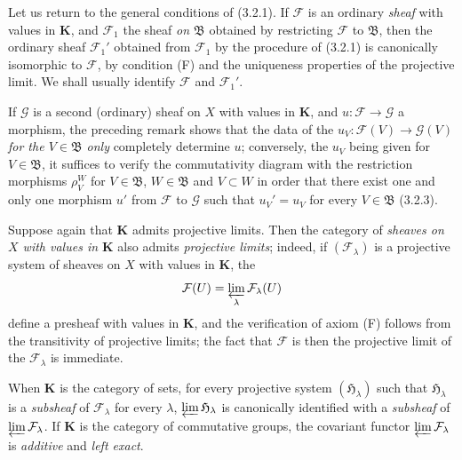 \begin{env}[3.2.5]
\label{0.3.2.5}
Let us return to the general conditions of (3.2.1). If $\mathcal{F}$ is an
ordinary \emph{sheaf} with values in $\boldsymbol{K}$, and $\mathcal{F}_1$ the
sheaf \emph{on $\mathfrak{B}$} obtained by restricting $\mathcal{F}$ to
$\mathfrak{B}$, then the ordinary sheaf $\mathcal{F}_1'$ obtained from
$\mathcal{F}_1$ by the procedure of (3.2.1) is canonically isomorphic to
$\mathcal{F}$, by condition (F) and the uniqueness properties of the
projective limit. We shall usually identify $\mathcal{F}$ and
$\mathcal{F}_1'$.

If $\mathcal{G}$ is a second (ordinary) sheaf on $X$ with values in
$\boldsymbol{K}$, and $u:\mathcal{F}\to\mathcal{G}$ a morphism, the preceding
remark shows that the data of the
$u_V:\mathcal{F}(V)\to\mathcal{G}(V)$ \emph{for the $V\in\mathfrak{B}$
only} completely determine $u$; conversely, the $u_V$
being given for $V\in\mathfrak{B}$, it suffices to verify the commutativity diagram
with the restriction morphisms $\rho_V^W$ for $V\in\mathfrak{B}$,
$W\in\mathfrak{B}$ and $V\subset W$ in order that there exist one and only one
morphism $u'$ from $\mathcal{F}$ to $\mathcal{G}$ such that $u_V'=u_V$ for every
$V\in\mathfrak{B}$ (3.2.3).
\end{env}

\begin{env}[3.2.6]
\label{0.3.2.6}
Suppose again that $\boldsymbol{K}$ admits projective limits. Then the
category of \emph{sheaves on $X$ with values in $\boldsymbol{K}$} also admits
\emph{projective limits}; indeed, if $(\mathcal{F}_\lambda)$ is a
projective system of sheaves on $X$ with values in $\boldsymbol{K}$, the
\[
  \mathcal{F}(U)=\varprojlim_\lambda\mathcal{F}_\lambda(U)
\]
define a presheaf with values in $\boldsymbol{K}$, and the
verification of axiom (F) follows from the transitivity of projective
limits; the fact that $\mathcal{F}$ is then the projective limit of the
$\mathcal{F}_\lambda$ is immediate.

When $\boldsymbol{K}$ is the category of sets, for every
projective system $(\mathfrak{H}_\lambda)$ such
that $\mathfrak{H}_\lambda$ is a \emph{subsheaf} of
$\mathcal{F}_\lambda$ for every $\lambda$,
$\varprojlim\mathfrak{H}_\lambda$ is canonically identified with a
\emph{subsheaf} of $\varprojlim\mathcal{F}_\lambda$. If
$\boldsymbol{K}$ is the category of commutative groups, the covariant functor
$\varprojlim\mathcal{F}_\lambda$ is \emph{additive} and \emph{left exact}.
\end{env}

